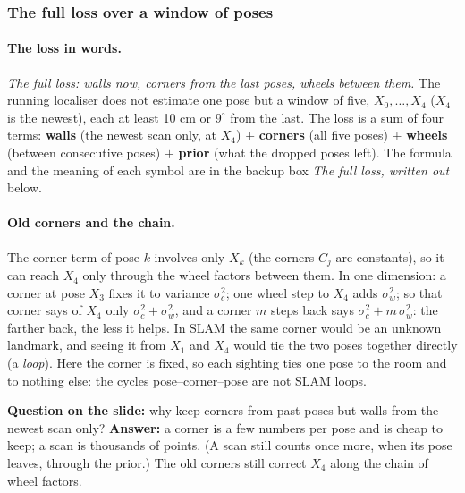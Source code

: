 \documentclass[11pt]{article}
\newcommand{\slt}[1]{\emph{#1}}   %
\begin{document}
\subsubsection*{The full loss over a window of poses}

\paragraph{The loss in words.} \slt{The full loss: walls now, corners from the last poses, wheels between them.} The running localiser does not estimate one pose but a window of five, $X_0,\dots,X_4$ ($X_4$ is the newest), each at least 10 cm or $9^\circ$ from the last. The loss is a sum of four terms: \textbf{walls} (the newest scan only, at $X_4$) $+$ \textbf{corners} (all five poses) $+$ \textbf{wheels} (between consecutive poses) $+$ \textbf{prior} (what the dropped poses left). The formula and the meaning of each symbol are in the backup box \slt{The full loss, written out} below.

\paragraph{Old corners and the chain.} The corner term of pose $k$ involves only $X_k$ (the corners $C_j$ are constants), so it can reach $X_4$ only through the wheel factors between them. In one dimension: a corner at pose $X_3$ fixes it to variance $\sigma_c^2$; one wheel step to $X_4$ adds $\sigma_w^2$; so that corner says of $X_4$ only $\sigma_c^2+\sigma_w^2$, and a corner $m$ steps back says $\sigma_c^2+m\,\sigma_w^2$: the farther back, the less it helps. In SLAM the same corner would be an unknown landmark, and seeing it from $X_1$ and $X_4$ would tie the two poses together directly (a \emph{loop}). Here the corner is fixed, so each sighting ties one pose to the room and to nothing else: the cycles pose--corner--pose are not SLAM loops.

\textbf{Question on the slide:} why keep corners from past poses but walls from the newest scan only? \textbf{Answer:} a corner is a few numbers per pose and is cheap to keep; a scan is thousands of points. (A scan still counts once more, when its pose leaves, through the prior.) The old corners still correct $X_4$ along the chain of wheel factors.

\begin{center}
\end{center}
\end{document}
